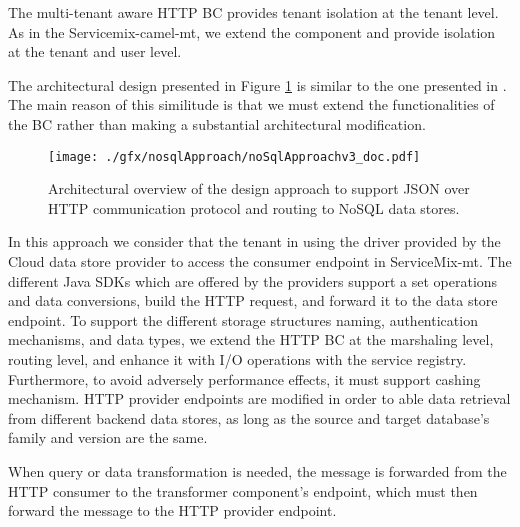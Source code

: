 The multi-tenant aware \ac{HTTP} \ac{BC} provides tenant isolation at the tenant level. As in the Servicemix-camel-mt, we extend the component and provide isolation at the tenant and user level.

The architectural design presented in Figure \ref{fig:designnosql} is similar to the one presented in \cite{gomez2012}. The main reason of this similitude is that we must extend the functionalities of the \ac{BC} rather than making a substantial architectural modification. 

\begin{figure}[htb]
	\centering
		\texttt{[image: ./gfx/nosqlApproach/noSqlApproachv3\_doc.pdf]}
	\caption[NoSQL Support]{Architectural overview of the design approach to support \ac{JSON} over \ac{HTTP} communication protocol and routing to \ac{NoSQL} data stores.}
	\label{fig:designnosql}
\end{figure}

In this approach we consider that the tenant in using the driver provided by the Cloud data store provider to access the consumer endpoint in ServiceMix-mt. The different Java SDKs which are offered by the providers support a set operations and data conversions, build the \ac{HTTP} request, and forward it to the data store endpoint. To support the different storage structures naming, authentication mechanisms, and data types, we extend the \ac{HTTP} \ac{BC} at the marshaling level, routing level, and enhance it with I/O operations with the service registry. Furthermore, to avoid adversely performance effects, it must support cashing mechanism. \ac{HTTP} provider endpoints are modified in order to able data retrieval from different backend data stores, as long as the source and target database's family and version are the same. 

When query or data transformation is needed, the message is forwarded from the \ac{HTTP} consumer to the transformer component's endpoint, which must then forward the message to the \ac{HTTP} provider endpoint.  

\FloatBarrier